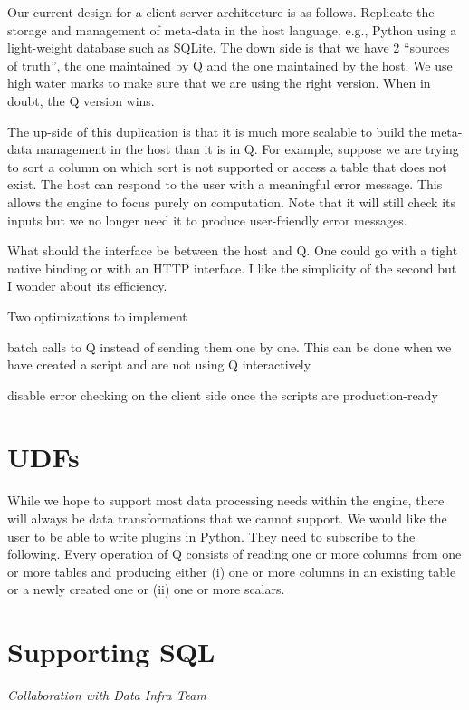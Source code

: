 Our current design for a client-server architecture is as follows.
Replicate the storage and management of meta-data in the host language, 
e.g., Python using a light-weight database such as SQLite. The down side
is that we have 2 ``sources of truth'', the one maintained by Q and the
one maintained by the host. We use high water marks to make sure that we
are using the right version. When in doubt, the Q version wins. 

The up-side of this duplication is that it is much more scalable to
build the meta-data management in the host than it is in Q. For example,
suppose we are trying to sort a column on which sort is not supported or
access a table that does not exist. The host can respond to the user
with a meaningful error message. This allows the engine to focus
purely on computation. Note that it will still check its inputs but we
no longer need it to produce user-friendly error messages.

What should the interface be between the host and Q. One could go with a
tight native binding or with an HTTP interface. I like the simplicity of
the second but I wonder about its efficiency.

Two optimizations to implement
\be
\item batch calls to Q instead of sending them one by one. This can be
done when we have created a script and are not using Q interactively
\item disable error checking on the client side once the scripts are
production-ready
\ee
\ed
\ei

\section{UDFs}
\label{UDFs}

While we hope to support most data processing needs within the engine,
there will always be data transformations that we cannot support. We
would like the user to be able to write plugins in Python. They need to
subscribe to the following.
Every operation of Q consists of reading one or more columns
from one or more tables and producing either (i) one or more columns in
an existing table or a newly created one or (ii) one or more scalars.

\section{Supporting SQL}
\label{Supporting_SQL}
{\em Collaboration with Data Infra Team}

